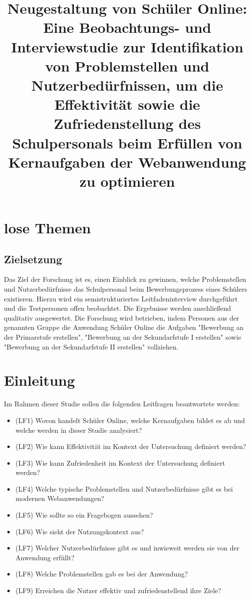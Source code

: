 \section{lose Themen}
\subsection{Zielsetzung}
Das Ziel der Forschung ist es, einen Einblick zu gewinnen, welche Problemstellen und Nutzerbedürfnisse das Schulpersonal beim Bewerbungsprozess eines Schülers existieren. Hierzu wird ein semistrukturiertes Leitfadeninterview durchgeführt und die Testpersonen offen beobachtet. Die Ergebnisse werden anschließend qualitativ ausgewertet. Die Forschung wird betrieben, indem Personen aus der genannten Gruppe die Anwendung Schüler Online die Aufgaben "Bewerbung an der Primarstufe erstellen", "Bewerbung an der Sekundarfstufe I erstellen" sowie "Bewerbung an der Sekundarfstufe II erstellen" vollziehen. 


\title{Neugestaltung von Schüler Online: Eine Beobachtungs- und Interviewstudie zur Identifikation von Problemstellen und Nutzerbedürfnissen, um die Effektivität sowie die Zufriedenstellung des Schulpersonals beim Erfüllen von Kernaufgaben der Webanwendung zu optimieren}

\section{Einleitung}
Im Rahmen dieser Studie sollen die folgenden Leitfragen beantwortete werden: 
\begin{itemize}
    \item (LF1) Wovon handelt Schüler Online, welche Kernaufgaben bildet es ab und welche werden in dieser Studie analysiert? %
    \item (LF2) Wie kann Effektivität im Kontext der Untersuchung definiert werden? %
    \item (LF3) Wie kann Zufriedenheit im Kontext der Untersuchung definiert werden? %
    \item (LF4) Welche typische Problemstellen und Nutzerbedürfnisse gibt es bei modernen Webanwendungen? %
    \item (LF5) Wie sollte so ein Fragebogen aussehen? %
    \item (LF6) Wie sieht der Nutzungskontext aus? %
    \item (LF7) Welcher Nutzerbedürfnisse gibt es und inwieweit werden sie von der Anwendung erfüllt? %
    \item (LF8) Welche Problemstellen gab es bei der Anwendung? %
    \item (LF9) Erreichen die Nutzer effektiv und zufriedenstellend ihre Ziele? %
\end{itemize}



